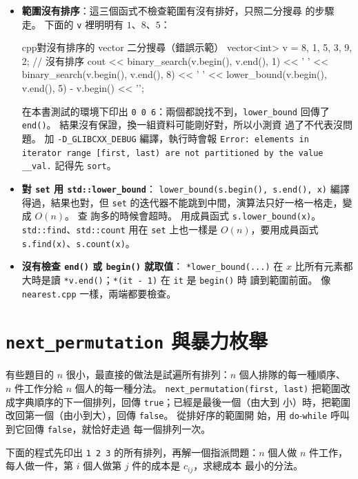 \begin{itemize}
\item \textbf{範圍沒有排序}：這三個函式不檢查範圍有沒有排好，只照二分搜尋
的步驟走。 下面的 \texttt{v} 裡明明有 $1$、$8$、$5$：
\begin{code}{cpp}{對沒有排序的 vector 二分搜尋（錯誤示範）}
vector<int> v = {8, 1, 5, 3, 9, 2};      // 沒有排序
cout << binary_search(v.begin(), v.end(), 1) << ' '
     << binary_search(v.begin(), v.end(), 8) << ' '
     << lower_bound(v.begin(), v.end(), 5) - v.begin() << '\n';
\end{code}
在本書測試的環境下印出 \texttt{0 0 6}：兩個都說找不到，\texttt{lower\_bound}
回傳了 \texttt{end()}。 結果沒有保證，換一組資料可能剛好對，所以小測資
過了不代表沒問題。 加 \texttt{-D\_GLIBCXX\_DEBUG} 編譯，執行時會報
\texttt{Error: elements in iterator range [first, last) are not partitioned
by the value \_\_val.} 記得先 \texttt{sort}。
\item \textbf{對 \texttt{set} 用 \texttt{std::lower\_bound}}：
\texttt{lower\_bound(s.begin(), s.end(), x)} 編譯得過，結果也對，但
\texttt{set} 的迭代器不能跳到中間，演算法只好一格一格走，變成 $O(n)$。 查
詢多的時候會超時。 用成員函式 \texttt{s.lower\_bound(x)}。
\texttt{std::find}、\texttt{std::count} 用在 \texttt{set} 上也一樣是
$O(n)$，要用成員函式 \texttt{s.find(x)}、\texttt{s.count(x)}。
\item \textbf{沒有檢查 \texttt{end()} 或 \texttt{begin()} 就取值}：
\texttt{*lower\_bound(...)} 在 $x$ 比所有元素都大時是讀
\texttt{*v.end()}；\texttt{*(it - 1)} 在 \texttt{it} 是 \texttt{begin()} 時
讀到範圍前面。 像 \texttt{nearest.cpp} 一樣，兩端都要檢查。
\end{itemize}

\section{\texttt{next\_permutation} 與暴力枚舉}
\label{sec:permutation}

有些題目的 $n$ 很小，最直接的做法是試遍所有排列：$n$ 個人排隊的每一種順序、
$n$ 件工作分給 $n$ 個人的每一種分法。 \texttt{next\_permutation(first, last)}
把範圍改成字典順序的下一個排列，回傳 \texttt{true}；已經是最後一個（由大到
小）時，把範圍改回第一個（由小到大），回傳 \texttt{false}。 從排好序的範圍開
始，用 \texttt{do}-\texttt{while} 呼叫到它回傳 \texttt{false}，就恰好走過
每一個排列一次。

下面的程式先印出 \texttt{1 2 3} 的所有排列，再解一個指派問題：$n$ 個人做
$n$ 件工作，每人做一件，第 $i$ 個人做第 $j$ 件的成本是 $c_{ij}$，求總成本
最小的分法。

